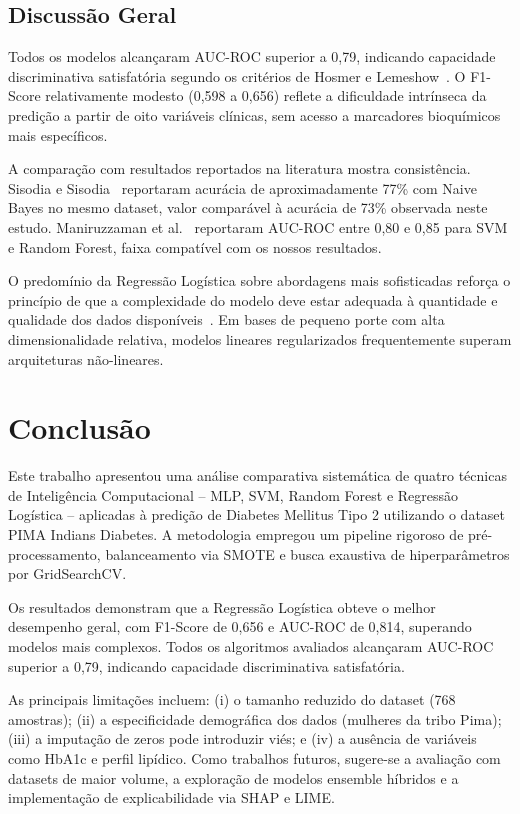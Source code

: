 \documentclass[conference]{IEEEtran}
\begin{document}
\subsection{Discuss\~ao Geral}

Todos os modelos alcan\c{c}aram AUC-ROC superior a 0,79, indicando capacidade discriminativa satisfat\'{o}ria segundo os crit\'{e}rios de Hosmer e Lemeshow~\cite{hosmer2013}. O F1-Score relativamente modesto (0,598 a 0,656) reflete a dificuldade intr\'{i}nseca da predi\c{c}\~ao a partir de oito vari\'{a}veis cl\'{i}nicas, sem acesso a marcadores bioqu\'{i}micos mais espec\'{i}ficos.

A compara\c{c}\~ao com resultados reportados na literatura mostra consist\^{e}ncia. Sisodia e Sisodia~\cite{sisodia2018} reportaram acur\'{a}cia de aproximadamente 77\% com Naive Bayes no mesmo dataset, valor compar\'{a}vel \`{a} acur\'{a}cia de 73\% observada neste estudo. Maniruzzaman et al.~\cite{maniruzzaman2017} reportaram AUC-ROC entre 0,80 e 0,85 para SVM e Random Forest, faixa compat\'{i}vel com os nossos resultados.

O predom\'{i}nio da Regress\~ao Log\'{i}stica sobre abordagens mais sofisticadas refor\c{c}a o princ\'{i}pio de que a complexidade do modelo deve estar adequada \`{a} quantidade e qualidade dos dados dispon\'{i}veis~\cite{haykin2009}. Em bases de pequeno porte com alta dimensionalidade relativa, modelos lineares regularizados frequentemente superam arquiteturas n\~ao-lineares.

\section{Conclus\~ao}

Este trabalho apresentou uma an\'{a}lise comparativa sistem\'{a}tica de quatro t\'{e}cnicas de Intelig\^{e}ncia Computacional -- MLP, SVM, Random Forest e Regress\~ao Log\'{i}stica -- aplicadas \`{a} predi\c{c}\~ao de Diabetes Mellitus Tipo 2 utilizando o dataset PIMA Indians Diabetes. A metodologia empregou um pipeline rigoroso de pr\'{e}-processamento, balanceamento via SMOTE e busca exaustiva de hiperpar\^{a}metros por GridSearchCV.

Os resultados demonstram que a Regress\~ao Log\'{i}stica obteve o melhor desempenho geral, com F1-Score de 0,656 e AUC-ROC de 0,814, superando modelos mais complexos. Todos os algoritmos avaliados alcan\c{c}aram AUC-ROC superior a 0,79, indicando capacidade discriminativa satisfat\'{o}ria.

As principais limita\c{c}\~oes incluem: (i) o tamanho reduzido do dataset (768 amostras); (ii) a especificidade demogr\'{a}fica dos dados (mulheres da tribo Pima); (iii) a imputa\c{c}\~ao de zeros pode introduzir vi\'{e}s; e (iv) a aus\^{e}ncia de vari\'{a}veis como HbA1c e perfil lip\'{i}dico. Como trabalhos futuros, sugere-se a avalia\c{c}\~ao com datasets de maior volume, a explora\c{c}\~ao de modelos ensemble h\'{i}bridos e a implementa\c{c}\~ao de explicabilidade via SHAP e LIME.
\end{document}
